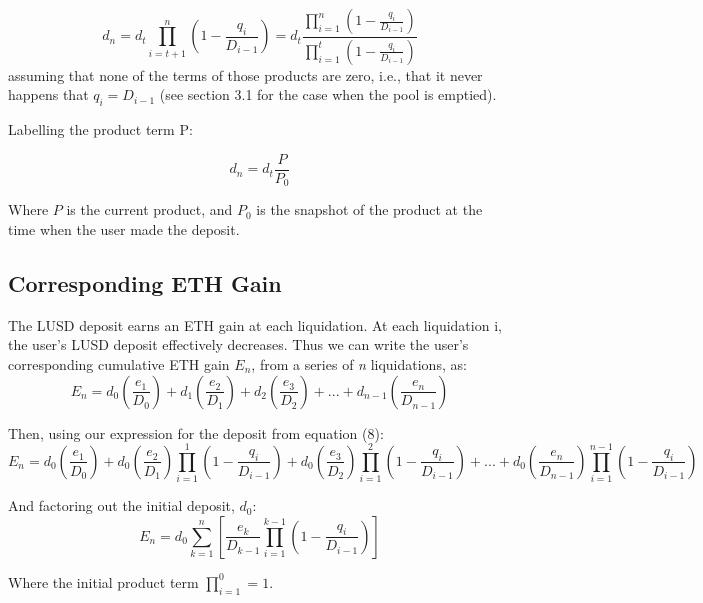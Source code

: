\documentclass[reqno]{article}
\begin{document}
\begin{equation} 
    d_n=d_t\prod^n_{i=t+1}{\left(1-\frac{q_i}{D_{i-1}}\right)}=d_t\frac{\displaystyle\prod^n_{i=1}{\left(1-\frac{q_i}{D_{i-1}}\right)}}{\displaystyle\prod^t_{i=1}\left(1-\frac{q_i}{D_{i-1}}\right)}
\end{equation}
assuming that none of the terms of those products are zero, i.e., that it never
happens that $q_i = D_{i-1}$ (see section 3.1 for the case when the pool is emptied).

\bigskip
Labelling the product term P:

\begin{equation} 
d_n=d_t\frac{P}{P_0}
\end{equation}

\bigskip
Where $P$ is the current product, and {$P_0$} is the snapshot of the product at the time when the user made the deposit.

\bigskip
\subsection{Corresponding ETH Gain}

\bigskip
The LUSD deposit earns an ETH gain at each liquidation.
At each liquidation i, the user’s LUSD deposit effectively decreases. Thus we can write the
user’s corresponding cumulative ETH gain $E_{n}$, from a series of \textit{n} liquidations, as:
\begin{equation} 
E_n=d_0\left(\frac{e_1}{D_0}\right)+d_1\left(\frac{e_2}{D_1}\right)+d_2\left(\frac{e_3}{D_2}\right)+...+d_{n-1}\left(\frac{e_n}{D_{n-1}}\right)
\end{equation}

\bigskip
Then, using our expression for the deposit from equation (8):
\begin{equation} 
E_n=d_0\left(\frac{e_1}{D_0}\right)+d_0\left(\frac{e_2}{D_1}\right)\prod^1_{i=1}\left(1-\frac{q_i}{D_{i-1}}\right)+d_0\left(\frac{e_3}{D_2}\right)\prod^2_{i=1}\left(1-\frac{q_i}{D_{i-1}}\right)+...+d_0\left(\frac{e_n}{D_{n-1}}\right)\prod^{n-1}_{i=1}\left(1-\frac{q_i}{D_{i-1}}\right)
\end{equation}

\bigskip
And factoring out the initial deposit, $d_0$:
\begin{equation} 
    E_n=d_0\sum^n_{k=1}\left[\frac{e_k}{D_{k-1}}\prod^{k-1}_{i=1}\left(1-\frac{q_i}{D_{i-1}}\right)\right]
\end{equation}

\bigskip
Where the initial product term $\displaystyle\prod^0_{i=1}=1$.
\end{document}
